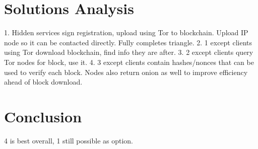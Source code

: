 \section{Solutions Analysis}

1. Hidden services sign registration, upload using Tor to blockchain. Upload IP node so it can be contacted directly. Fully completes triangle.
2. 1 except clients using Tor download blockchain, find info they are after.
3. 2 except clients query Tor nodes for block, use it.
4. 3 except clients contain hashes/nonces that can be used to verify each block. Nodes also return onion as well to improve efficiency ahead of block download.

\section{Conclusion}

4 is best overall, 1 still possible as option.